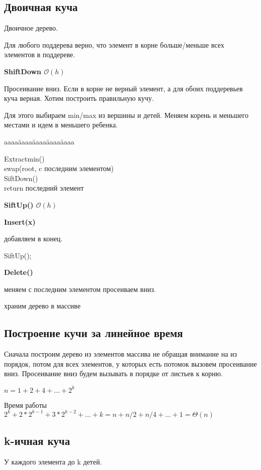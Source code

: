 \documentclass[12pt]{article}
\def\t{\texttt}
\def\O{\mathcal{O}}
\newenvironment{MyTabbing}{
\t\bgroup
\begin{tabbing}
aaaa\=aaaa\=aaaa\=aaaa\=aaaa\kill
}{
\end{tabbing}
\t\egroup
}
\begin{document}
\subsection{Двоичная куча}

Двоичное дерево.

Для любого поддерева верно, что элемент в корне больше/меньше всех элементов в поддереве.

{\bf ShiftDown $\O(h)$}

Просеивание вниз.  Если в корне не верный элемент, а для обоих поддеревьев куча верная. Хотим построить правильную кучу.


Для этого выбираем min/max из вершины и детей. Меняем корень и меньшего местами и идем в меньшего ребенка.


\begin{MyTabbing}
Extractmin()\\
\>swap(root, c последним элементом)\\
\>SiftDown()\\
\>return последний элемент\\
\end{MyTabbing}

{\bf SiftUp() $\O(h)$}

{\bf Insert(x)}

добавляем в конец.

SiftUp();

{\bf Delete()} 

меняем с последним элементом просеиваем вниз.

храним дерево в массиве

\subsection{Построение кучи за линейное время}

Сначала построим дерево из элементов массива не обращая внимание на из порядок, потом для всех элементов, у которых есть потомок вызовем просеивание вниз. Просеивание вниз будем вызывать в порядке от листьев к корню.

$n = 1 + 2 + 4 + \ldots + 2 ^ k$

Время работы $2^k+ 2*2^{k - 1} + 3*2^{k - 2} + \ldots + k = n + n/2 + n/4 + \ldots + 1 = \Theta(n)$ 

\subsection{k-ичная куча}

У каждого элемента до k детей.
\end{document}
